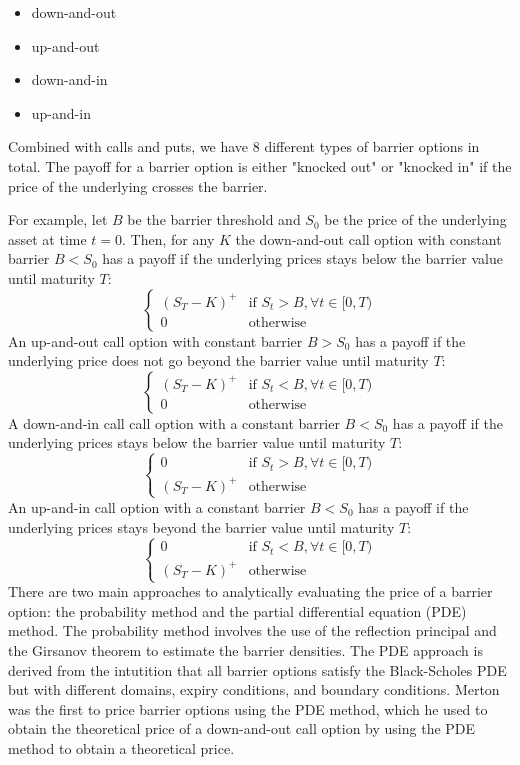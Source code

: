 \begin{itemize}
	\item down-and-out
	\item up-and-out
	\item down-and-in
	\item up-and-in
\end{itemize}

Combined with calls and puts, we have 8 different types of barrier options in total. The payoff for a barrier option is either "knocked out" or "knocked in" if the price of the underlying crosses the barrier. 

For example, let $B$ be the barrier threshold and $S_0$ be the price of the underlying asset at time $t=0$. Then, for any $K$ the down-and-out call option with constant barrier $B<S_0$ has a payoff if the underlying prices stays below the barrier value until maturity $T$:
\begin{equation}
	\begin{cases}
	\left(S_T-K\right)^+  & \text{if }S_t>B,\forall t\in[0,T) \\
	0 & \text{otherwise}
	\end{cases}
\end{equation}
An up-and-out call option with constant barrier $B>S_0$ has a payoff if the underlying price does not go beyond the barrier value until maturity $T$:
\begin{equation}
	\begin{cases}
		\left(S_T-K\right)^+  & \text{if }S_t<B,\forall t\in[0,T) \\
		0 & \text{otherwise}
	\end{cases}
\end{equation}
A down-and-in call call option with a constant barrier $B<S_0$ has a payoff if the underlying prices stays below the barrier value until maturity $T$:
\begin{equation}
	\begin{cases}
		0 & \text{if }S_t>B,\forall t\in[0,T) \\
		\left(S_T-K\right)^+ & \text{otherwise}
	\end{cases}
\end{equation}
An up-and-in call option with a constant barrier $B<S_0$ has a payoff if the underlying prices stays beyond the barrier value until maturity $T$:
\begin{equation}
	\begin{cases}
		0 & \text{if }S_t<B,\forall t\in[0,T) \\
		\left(S_T-K\right)^+ & \text{otherwise}
	\end{cases}
\end{equation}
There are two main approaches to analytically evaluating the price of a barrier option: the probability method and the partial differential equation (PDE) method. The probability method involves the use of the reflection principal and the Girsanov theorem to estimate the barrier densities. The PDE approach is derived from the intutition that all barrier options satisfy the Black-Scholes PDE but with different domains, expiry conditions, and boundary conditions. Merton was the first to price barrier options using the PDE method, which he used to obtain the theoretical price of a down-and-out call option by using the PDE method to obtain a theoretical price.